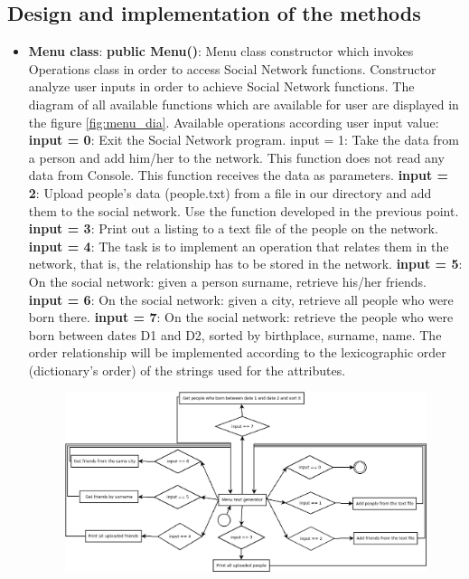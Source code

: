 \documentclass[a4paper]{article}
\begin{document}
\subsection{Design and implementation of the methods}
\begin{itemize}
\item \textbf{Menu class}:
\subitem  \textbf{public Menu()}: Menu class constructor which invokes Operations class in order to access Social Network functions. Constructor analyze user inputs in order to achieve Social Network functions. The diagram of all available functions which are available for user are displayed in the figure \ref{fig:menu_dia}. Available operations according user input value:
\subsubitem \textbf{input = 0}: Exit the Social Network program.
\subsubitem input = 1: Take the data from a person and add him/her to the network.
This function does not read any data from Console. This function receives the data as
parameters.
\subsubitem \textbf{input = 2}: Upload people's data (people.txt) from a file in our directory
and add them to the social network. Use the function developed in the previous
point.
\subsubitem \textbf{input = 3}: Print out a listing to a text file of the people on the network.
\subsubitem \textbf{input = 4}: The task is to implement an operation that relates
them in the network, that is, the relationship has to be stored in the network.
\subsubitem \textbf{input = 5}: On the social network: given a person surname, retrieve his/her friends.
\subsubitem \textbf{input = 6}: On the social network: given a city, retrieve all people who were born there.
\subsubitem \textbf{input = 7}: On the social network: retrieve the people who were born between dates D1 and D2,
sorted by birthplace, surname, name. The order relationship will be implemented
according to the lexicographic order (dictionary's order) of the strings used for the
attributes.
\begin{figure}[H]
\centering
\includegraphics[width=1.2\textwidth]{Menu.png}

\end{figure}
\end{itemize}
\end{document}
